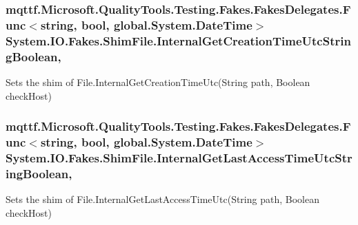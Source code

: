 \hypertarget{class_system_1_1_i_o_1_1_fakes_1_1_shim_file_ae49c156032823cdee2ac4b15a4be9dab}{
\subsubsection[{Internal\-Get\-Creation\-Time\-Utc\-String\-Boolean}]{\setlength{\rightskip}{0pt plus 5cm}mqttf.\-Microsoft.\-Quality\-Tools.\-Testing.\-Fakes.\-Fakes\-Delegates.\-Func$<$string, bool, global.\-System.\-Date\-Time$>$ System.\-I\-O.\-Fakes.\-Shim\-File.\-Internal\-Get\-Creation\-Time\-Utc\-String\-Boolean\hspace{0.3cm}{\ttfamily [static]}, {\ttfamily [set]}}}\label{class_system_1_1_i_o_1_1_fakes_1_1_shim_file_ae49c156032823cdee2ac4b15a4be9dab}


Sets the shim of File.\-Internal\-Get\-Creation\-Time\-Utc(\-String path, Boolean check\-Host)

\hypertarget{class_system_1_1_i_o_1_1_fakes_1_1_shim_file_a506f1d51c9c4233bc8cae18f378a7c01}{
\subsubsection[{Internal\-Get\-Last\-Access\-Time\-Utc\-String\-Boolean}]{\setlength{\rightskip}{0pt plus 5cm}mqttf.\-Microsoft.\-Quality\-Tools.\-Testing.\-Fakes.\-Fakes\-Delegates.\-Func$<$string, bool, global.\-System.\-Date\-Time$>$ System.\-I\-O.\-Fakes.\-Shim\-File.\-Internal\-Get\-Last\-Access\-Time\-Utc\-String\-Boolean\hspace{0.3cm}{\ttfamily [static]}, {\ttfamily [set]}}}\label{class_system_1_1_i_o_1_1_fakes_1_1_shim_file_a506f1d51c9c4233bc8cae18f378a7c01}


Sets the shim of File.\-Internal\-Get\-Last\-Access\-Time\-Utc(\-String path, Boolean check\-Host)

